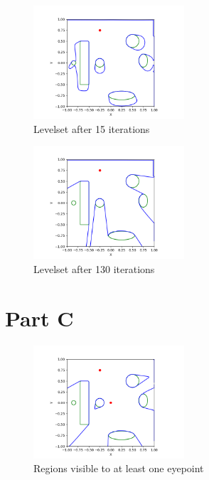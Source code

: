 \documentclass{article}
\begin{document}
\begin{figure}[H]
    \caption{Levelset after 15 iterations}
    \centering
        \includegraphics[width=0.5\textwidth]{part_b-levelset-0015.png}
\end{figure}

\begin{figure}[H]
    \caption{Levelset after 130 iterations}
    \centering
        \includegraphics[width=0.5\textwidth]{part_b-levelset-0130.png}
\end{figure}




\newpage
\section*{Part C}
\begin{figure}[H]
    \caption{Regions visible to at least one eyepoint}
    \centering
        \includegraphics[width=0.5\textwidth]{part-c.png}
\end{figure}
\end{document}
